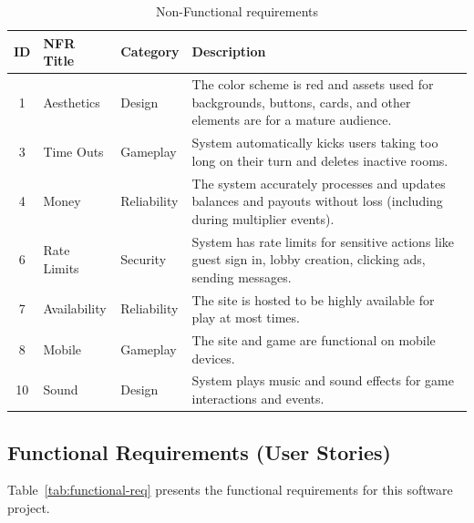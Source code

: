 \documentclass{article}
\begin{document}
\begin{table}[h!]
\centering
\begin{tabular}{c l l p{8.5cm}}
\hline
\textbf{ID} & \textbf{NFR Title} & \textbf{Category} & \textbf{Description} \\
\hline
1 & Aesthetics & Design & The color scheme is red and assets used for backgrounds, buttons, cards, and other elements are for a mature audience. \\ \hline
3 & Time Outs & Gameplay & System automatically kicks users taking too long on their turn and deletes inactive rooms. \\ \hline
4 & Money & Reliability & The system accurately processes and updates balances and payouts without loss (including during multiplier events). \\ \hline
6 & Rate Limits & Security & System has rate limits for sensitive actions like guest sign in, lobby creation, clicking ads, sending messages. \\ \hline
7 & Availability & Reliability & The site is hosted to be highly available for play at most times. \\ \hline
8 & Mobile & Gameplay & The site and game are functional on mobile devices. \\ \hline
10 & Sound & Design & System plays music and sound effects for game interactions and events. \\ \hline
\end{tabular}
\caption{Non-Functional requirements}\label{tab:nfr}
\end{table}

\subsection{Functional Requirements (User Stories)}
Table~\ref{tab:functional-req} presents the functional requirements for this software project.
\end{document}
